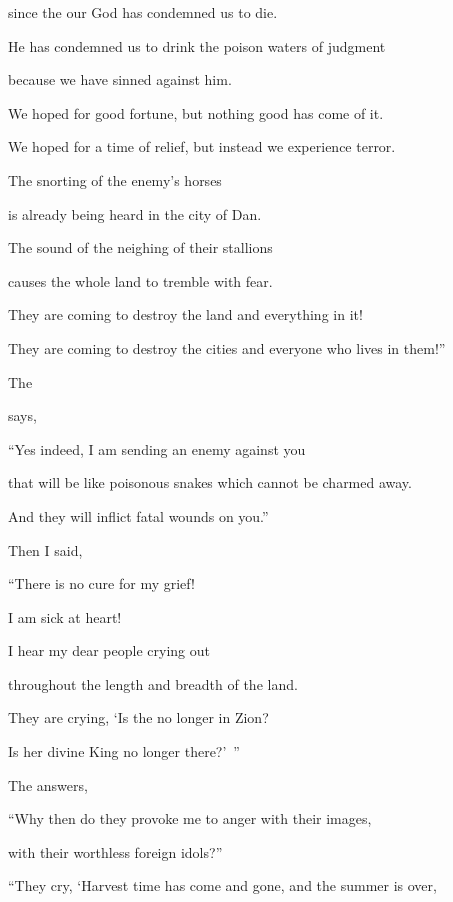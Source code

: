 {\par }{\Q since
the {}
our God
has condemned us to die.
\par }{\Q He has condemned us to drink
the poison
waters
of judgment

\par }{\Q because
we have sinned
against him.
\par }{\Q {}We hoped
for good fortune,
but nothing
good
has come of it.
\par }{\Q We hoped for a time
of relief,
but instead we experience terror.
\par }{\Q {}The snorting
of the enemy’s horses
\par }{\Q is already being heard
in the city of Dan.
\par }{\Q The sound
of the neighing
of their stallions
\par }{\Q causes the whole
land
to tremble
with fear.
\par }{\Q They are coming
to destroy
the land
and everything
in it!
\par }{\Q They are coming to destroy the cities
and everyone who lives in them!”
\par }{\PP {}The

{}
says,
\par }{\Q “Yes
indeed,
I am sending
an enemy against you
\par }{\Q that will be like poisonous snakes
which
cannot
be charmed
away.

\par }{\Q And they will inflict fatal wounds on you.”
\par }{\PP {}Then I said,

\par }{\Q “There is no cure
for my grief!
\par }{\Q I am sick
at heart!
\par }{\Q {}I
hear
my dear
people
crying out
\par }{\Q throughout the length and breadth
of the land.
\par }{\Q They are crying, ‘Is the
{}
no
longer in Zion?
\par }{\Q Is her divine King
no
longer there?’ ”
\par }{\Q The
{} answers,

\par }{\Q “Why
then do they provoke
me to anger
with their images,
\par }{\Q with their worthless
foreign idols?”
\par }{\Q {}“They cry, ‘Harvest
time has
come and gone,
and the summer
is over,

}
